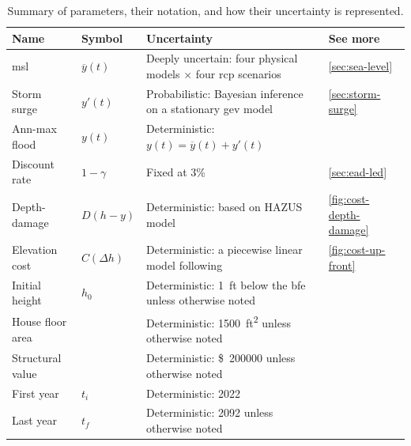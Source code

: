 \documentclass[12pt]{article}
\newcommand{\usd}[1]{\SI{#1}[\$]{}}
\begin{document}
\begin{table}
    \centering
    \caption{
        Summary of parameters, their notation, and how their uncertainty is represented.
    }\label{tab:uncertainties}
    \begin{tabular}{l l p{3in} l}
        \toprule
        Name             & Symbol            & Uncertainty                                                                          & See more                     \\
        \midrule
        \Gls{msl}        & $\overline{y}(t)$ & Deeply uncertain: four physical models $\times$ four \acrshort{rcp} scenarios        & \cref{sec:sea-level}         \\
        Storm surge      & $y'(t)$           & Probabilistic: Bayesian inference on a stationary \acrshort{gev} model               & \cref{sec:storm-surge}       \\
        Ann-max flood    & $y(t)$            & Deterministic: $y(t)=\overline{y}(t)+y'(t)$                                          &                              \\
        Discount rate    & $1-\gamma$        & Fixed at 3\%                                                                         & \cref{sec:ead-led}           \\
        Depth-damage     & $D(h-y)$          & Deterministic: based on HAZUS model                                                  & \cref{fig:cost-depth-damage} \\
        Elevation cost   & $C(\Delta h)$     & Deterministic: a piecewise linear model following \citet{zarekarizi_suboptimal:2020} & \cref{fig:cost-up-front}     \\
        Initial height   & $h_0$             & Deterministic: \SI{1}{ft} below the \gls{bfe} unless otherwise noted                 &                              \\
        House floor area &                   & Deterministic: \SI{1500}{ft^2} unless otherwise noted                                &                              \\
        Structural value &                   & Deterministic: \usd{200000} unless otherwise noted                                   &                              \\
        First year       & $t_i$             & Deterministic: 2022                                                                  &                              \\
        Last year        & $t_f$             & Deterministic: 2092 unless otherwise noted                                           &                              \\
        \bottomrule
    \end{tabular}
\end{table}
\end{document}
